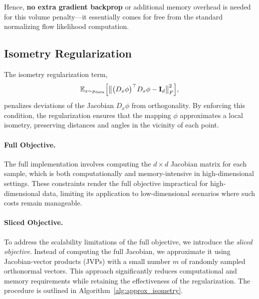 Hence, \textbf{no extra gradient backprop} or additional memory overhead is needed for this volume penalty—it essentially comes for free from the standard normalizing flow likelihood computation.

\subsection{Isometry Regularization}\label{app:scalable_isometry_regularisation}

The isometry regularization term,  
\[
\mathbb{E}_{x \sim p_{\text{data}}} \Bigl[
   \bigl\|\bigl(D_x \phi \bigr)^\top D_x \phi 
   - \mathbf{I}_d\bigr\|_F^2
\Bigr],
\]  
penalizes deviations of the Jacobian \(D_x \phi\) from orthogonality. By enforcing this condition, the regularization ensures that the mapping \(\phi\) approximates a local isometry, preserving distances and angles in the vicinity of each point.

\paragraph{Full Objective.}  
The full implementation involves computing the \(d \times d\) Jacobian matrix for each sample, which is both computationally and memory-intensive in high-dimensional settings. These constraints render the full objective impractical for high-dimensional data, limiting its application to low-dimensional scenarios where such costs remain manageable.

\paragraph{Sliced Objective.}
To address the scalability limitations of the full objective, we introduce the \emph{sliced objective}. Instead of computing the full Jacobian, we approximate it using Jacobian-vector products (JVPs) with a small number \(m\) of randomly sampled orthonormal vectors. This approach significantly reduces computational and memory requirements while retaining the effectiveness of the regularization. The procedure is outlined in Algorithm~\ref{alg:approx_isometry}.

